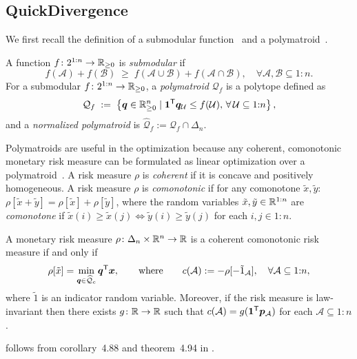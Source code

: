 \documentclass[10pt]{article} %
\renewcommand{\cite}{\citep}
\begin{document}
\subsection{QuickDivergence} \label{sec:quickdivergence}
We first recall the definition of a submodular function~\cite[section~2.1]{Korte2012} and a polymatroid~\cite[definition~14.9]{Korte2012}.
\begin{definition} \label{def:polymatroid}
A function $f \colon 2^{1{:}n} \to \mathbb{R}_{\ge 0}$ is \emph{submodular} if
\[ 
  f(\mathcal{A}) + f(\mathcal{B})
  \; \geq\;
  f(\mathcal{A} \cup \mathcal{\mathcal{B}}) + f(\mathcal{A} \cap \mathcal{B}),
  \quad
  \forall \mathcal{A}, \mathcal{B} \subseteq 1{:}n.
\]
For a submodular $f \colon 2^{1{:}n} \to \mathbb{R}_{\ge 0}$, a \emph{polymatroid} $\mathcal{Q}_f$ is a polytope defined as
  \[
    \mathcal{Q}_f
    \;:=\;
    \left\{ \bm{q} \in \mathbb{R}_{\ge 0}^n  \mid   \bm{1}^{\mathsf{T}} \bm{q}_{\mathcal{U}} \leq f(\mathcal{U}), \, \forall \,  \mathcal{U} \subseteq 1{:}n \right\},
\]
and a \emph{normalized polymatroid} is $\widehat{\mathcal{Q}}_f := \mathcal{Q}_f \cap \Delta_n $.
\end{definition}

Polymatroids are useful in the optimization because any coherent, comonotonic monetary risk measure can be formulated as linear optimization over a polymatroid~\cite[corollary~4.89]{Follmer2016}. A risk measure $\rho$ is \emph{coherent} if it is concave and positively homogeneous.  A risk measure $\rho$ is \emph{comonotonic} if for any comonotone $\tilde{x}, \tilde{y}$: $\rho[ \tilde{x} + \tilde{y} ] = \rho[ \tilde{x} ] + \rho[ \tilde{y} ]$, where the random variables $\tilde{x}, \tilde{y} \in \mathbb{R}^{1{:}n}$ are \emph{comonotone} if $\tilde{x}(i) \ge \tilde{x}(j) \Leftrightarrow \tilde{y}(i) \ge \tilde{y}(j)$ for each $i,j\in 1{:}n$.

\begin{proposition} \label{prop:coherent-polymatroid}
A monetary risk measure $\rho\colon \Delta_n \times  \mathbb{R}^n \to \mathbb{R}$ is a coherent comonotonic risk measure if and only if
\begin{equation}\label{eq:comonotonic-optimization}
  \rho[\tilde{x}] = \min_{\bm{q}\in \widehat{\mathcal{Q}}_c} \bm{q}^{\mathsf{T}}  \bm{x},
  \qquad
  \text{where}
  \qquad
  c(\mathcal{A}) := -\rho[ -\tilde{1}_{\mathcal{A}} ], \quad \forall  \mathcal{A} \subseteq 1{:}n,
\end{equation}
where $\tilde{1}$ is an indicator random variable. Moreover, if the risk measure is law-invariant then there exists $g\colon \mathbb{R} \to \mathbb{R}$ such that $c(\mathcal{A}) = g(\bm{1}^{\mathsf{T}} \bm{p}_{\mathcal{A}})$ for each $\mathcal{A} \subseteq 1{:}n$.
\end{proposition}
 follows  from corollary~4.88 and theorem~4.94 in \citet{Follmer2016}.
\end{document}
